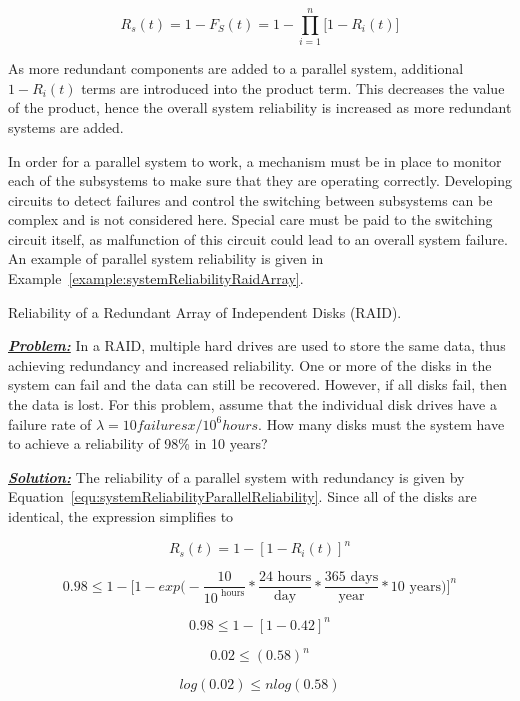 {\begin{equation}
\label{equ:systemReliabilityParallelReliability}
R_s(t) = 1-F_S(t) = 1 - \prod_{i=1}^n \big[ 1-R_i(t) \big]
\end{equation}

As more redundant components are added to a parallel system, additional
$1-R_i(t)$ terms are introduced into the
product term. This decreases the value of the product, hence the overall
system reliability is increased as more redundant systems are added.

In order for a parallel system to work, a mechanism must be in place to
monitor each of the subsystems to make sure that they are operating
correctly. Developing circuits to detect failures and control the
switching between subsystems can be complex and is not considered here.
Special care must be paid to the switching circuit itself, as
malfunction of this circuit could lead to an overall system failure. An
example of parallel system reliability is given in 
Example~\ref{example:systemReliabilityRaidArray}.


\begin{example}{Reliability of a Redundant Array of Independent Disks (RAID).}
\label{example:systemReliabilityRaidArray}

\emph{\textbf{\ul{Problem:}}} In a RAID, multiple hard drives are used
to store the same data, thus achieving redundancy and increased
reliability. One or more of the disks in the system can fail and the
data can still be recovered. However, if all disks fail, then the data
is lost. For this problem, assume that the individual disk drives have a
failure rate of $\lambda = 10 failuresx/10^6 hours$. How many disks
must the system have to achieve a reliability of 98\% in 10 years?

\emph{\textbf{\ul{Solution:}}} The reliability of a parallel system with
redundancy is given by Equation~\ref{equ:systemReliabilityParallelReliability}. 
Since all of the disks are identical, the expression simplifies to

$$R_s(t) = 1 - \left[ 1 - R_i(t) \right]^n$$

$$0.98 \leq 1 - \big[ 1 - exp\big( - \frac {10}{10^ \text{ hours}} * \frac{24 \text{ hours}}{\text{day}} * \frac{365 \text{ days}}{\text{year}} * 10 \text{ years} \big) \big]^n$$

$$0.98 \leq 1 - \left[1-0.42\right]^n$$

$$0.02 \leq (0.58)^n$$

$$log(0.02) \leq nlog(0.58)$$


\end{example}}
